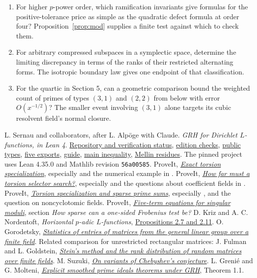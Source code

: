 \documentclass[10pt]{article}
\newcommand{\src}[2]{\href{https://github.com/lsernau/grh-lean/blob/72fead102f663d5c7a407964a13dc0cf9d977207/#1}{#2}}
\newcommand{\prior}[2]{\href{https://github.com/VladimirReshetnikov/ProveIt/blob/274841c1cb137aafbb60ab5f519c51fd42eee98e/docs/incoming/#1}{#2}}
\begin{document}
\begin{enumerate}[leftmargin=1.6em,itemsep=3pt]
\item For higher $p$-power order, which ramification invariants give formulas for the positive-tolerance price as simple as the quadratic defect formula at order four? Proposition~\ref{prop:mod} supplies a finite test against which to check them.
\item For arbitrary compressed subspaces in a symplectic space, determine the limiting discrepancy in terms of the ranks of their restricted alternating forms. The isotropic boundary law gives one endpoint of that classification.
\item For the quartic in Section 5, can a geometric comparison bound the weighted count of primes of types $(3,1)$ and $(2,2)$ from below with error $O(x^{-1/2})$? The smaller event involving $(3,1)$ alone targets its cubic resolvent field's normal closure.
\end{enumerate}
\begin{thebibliography}{99}\small\raggedright
{} L. Sernau and collaborators, after L. Alp\"oge with Claude. \emph{GRH for Dirichlet $L$-functions, in Lean 4}. \src{README.md}{Repository and verification status}, \src{grh/README.md}{edition checks}, \src{grh/src/Statements.lean}{public types}, \src{grh/src/Main.lean}{five exports}, \src{grh/GUIDE.md}{guide}, \src{grh/src/New/Reduction/MainInequality.lean}{main inequality}, \src{grh/src/New/Reduction/Zeros/PrimeError.lean}{Mellin residues}. The pinned project uses Lean 4.35.0 and Mathlib revision \texttt{56a00585}.
 ProveIt, \prior{grh_exact_torsion_transfer_2026-11-25.zip}{\emph{Exact torsion specialization}}, especially  and the numerical example in .
 ProveIt, \prior{grh-torsion-and-zero-data.zip}{\emph{How far must a torsion selector search?}}, especially  and the questions about coefficient fields in .
 ProveIt, \prior{grh-torsion-and-prime-sampling.zip}{\emph{Torsion specialization and sparse prime sums}}, especially ,  and the question on noncyclotomic fields.
 ProveIt, \prior{grh_sparse_singular_moduli.zip}{\emph{Five-term equations for singular moduli}}, section \emph{How sparse can a one-sided Frobenius test be?}
 D. Kriz and A. C. Nordentoft, \emph{Horizontal $p$-adic $L$-functions}, \href{https://arxiv.org/html/2310.20678v3}{Propositions 2.7 and 2.11}.
 O. Gorodetsky, \href{https://arxiv.org/abs/2610.29305}{\emph{Statistics of entries of matrices from the general linear group over a finite field}}. Related comparison for unrestricted rectangular matrices: J. Fulman and L. Goldstein, \href{https://doi.org/10.1214/13-AOP889}{\emph{Stein's method and the rank distribution of random matrices over finite fields}}.
 M. Suzuki, \href{https://arxiv.org/abs/2411.07436}{\emph{On variants of Chebyshev's conjecture}}. L. Greni\'e and G. Molteni, \href{https://doi.org/10.1090/mcom3039}{\emph{Explicit smoothed prime ideals theorems under GRH}}, Theorem 1.1.
\end{thebibliography}
\end{document}
